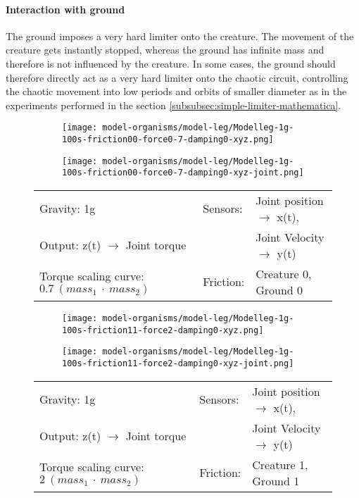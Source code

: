 \documentclass[main]{subfiles}
\begin{document}
\paragraph{Interaction with ground} The ground imposes a very hard limiter onto the creature. %
%
The movement of the creature gets instantly stopped, whereas the ground has infinite mass and therefore is not influenced by the creature. %
%
In some cases, the ground should therefore directly act as a very hard limiter onto the chaotic circuit, controlling the chaotic movement into low periods and orbits of smaller diameter as in the experiments performed in the section \ref{subsubsec:simple-limiter-mathematica}. 

\begin{figure}[H]
	\centering
		\begin{subfigure}[c]{0.45\textwidth}
	\texttt{[image: model-organisms/model-leg/Modelleg-1g-100s-friction00-force0-7-damping0-xyz.png]}
		\end{subfigure}
	\begin{subfigure}[c]{0.45\textwidth}
	\texttt{[image: model-organisms/model-leg/Modelleg-1g-100s-friction00-force0-7-damping0-xyz-joint.png]}
		\end{subfigure}
	\caption[Limited chaotic controller controlling model leg]{}
	\begin{tabular}{l|ll}
	\hline 
	Gravity: 1g  & Sensors: & Joint position \(\rightarrow\) x(t),\\
	 Output: z(t) \(\rightarrow\) Joint torque &  & Joint Velocity \(\rightarrow\) y(t) \\
	  Torque scaling curve: \(0.7~(mass_1~\cdot~mass_2)\) & Friction: & Creature 0, Ground 0 \\
	  \hline
	\end{tabular}
	
	\label{figure:limited-damped-model-leg-collision1}
\end{figure}

\begin{figure}[H]
	\centering
		\begin{subfigure}[c]{0.45\textwidth}
	\texttt{[image: model-organisms/model-leg/Modelleg-1g-100s-friction11-force2-damping0-xyz.png]}
		\end{subfigure}
	\begin{subfigure}[c]{0.45\textwidth}
	\texttt{[image: model-organisms/model-leg/Modelleg-1g-100s-friction11-force2-damping0-xyz-joint.png]}
		\end{subfigure}
	\caption[Limited chaotic controller controlling model leg]{}
	\begin{tabular}{l|ll}
	\hline 
	Gravity: 1g  & Sensors: & Joint position \(\rightarrow\) x(t),\\
	 Output: z(t) \(\rightarrow\) Joint torque &  & Joint Velocity \(\rightarrow\) y(t) \\
	  Torque scaling curve: \(2~(mass_1~\cdot~mass_2)\) & Friction: & Creature 1, Ground 1 \\
	  \hline
	\end{tabular}

	\label{figure:limited-damped-model-leg-collision2}
\end{figure}
\end{document}
